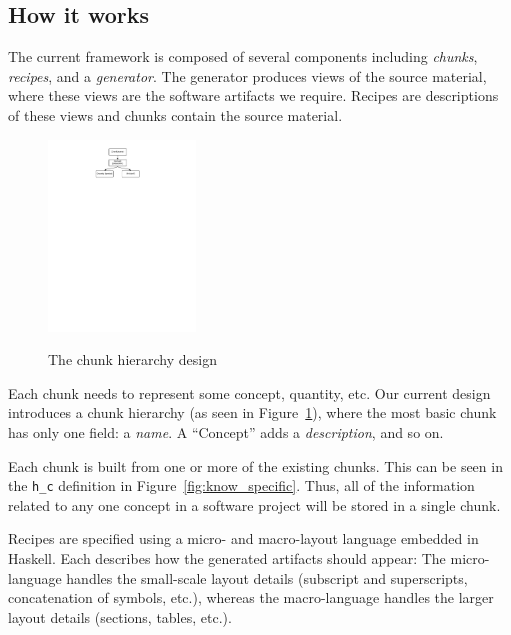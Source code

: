 \documentclass{sig-alternate-05-2015}
\begin{document}
\subsection{How it works} \label{sssec:ex_how}

The current framework is composed of several components including
\textit{chunks}, \textit{recipes}, and a \textit{generator}. The generator
produces views of the source material, where these views are the software
artifacts we require. Recipes are descriptions of these views and chunks contain
the source material.


\begin{figure}
\begin{center}
{
 \includegraphics[width=0.35\textwidth]{ChunkHierarchy.pdf}
}
\end{center}
\caption{The chunk hierarchy design}
\label{fig:chunks}
\end{figure}

Each chunk needs to represent some concept, quantity, etc. Our current design
introduces a chunk hierarchy (as seen in Figure~\ref{fig:chunks}), where the
most basic chunk has only one field: a \textit{name}. A ``Concept'' adds a
\textit{description}, and so on.

Each chunk is built from one or more of the existing chunks. This can be seen in
the \verb|h_c| definition in Figure~\ref{fig:know_specific}. Thus, all of the
information related to any one concept in a software project will be stored in a
single chunk.

Recipes are specified using a micro- and macro-layout language embedded in
Haskell. Each describes how the generated artifacts should appear: The
micro-language handles the small-scale layout details (subscript and
superscripts, concatenation of symbols, etc.), whereas the macro-language
handles the larger layout details (sections, tables, etc.).
\end{document}
